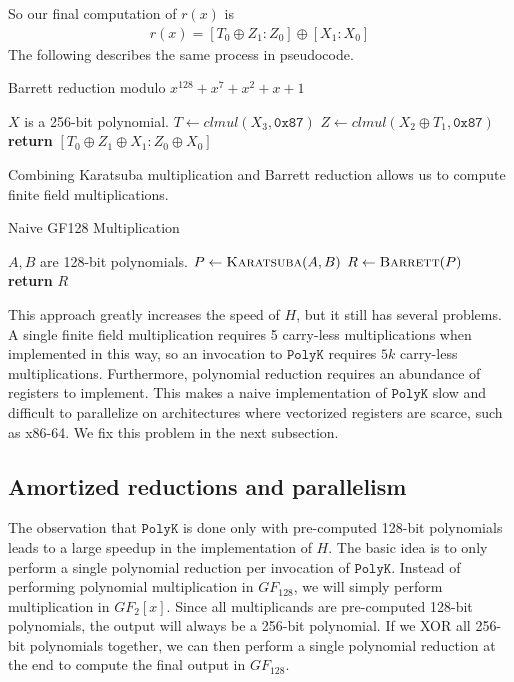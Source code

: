 \documentclass[hctr.tex]{subfiles}
\begin{document}
So our final computation of $r(x)$ is
\begin{align*}
       r(x) = [T_0 \oplus Z_1 : Z_0] \oplus [X_1 : X_0]
\end{align*}
The following describes the same process in pseudocode.
\begin{algorithm}[H]
	\caption{Barrett reduction modulo $x^{128} + x^7 + x^2 + x + 1$}\label{barrett}
\begin{algorithmic}[1]
	\Require $X$ is a 256-bit polynomial.
	 
		\State $T \gets clmul(X_3, \texttt{0x87})$
		\State $Z \gets clmul(X_2 \oplus T_1, \texttt{0x87})$ 
		\State \textbf{return} $[T_0 \oplus Z_1 \oplus X_1 : Z_0 \oplus X_0]$
	\EndProcedure
\end{algorithmic}
\end{algorithm}
Combining Karatsuba multiplication and Barrett reduction allows us to compute finite field multiplications.
\begin{algorithm}[H]
	\caption{Naive GF128 Multiplication}\label{GF128Naive}
\begin{algorithmic}[1]
	\Require $A, B$ are 128-bit polynomials.
		\State $P \gets \Call{Karatsuba}{A, B}$
		\State $R \gets \Call{Barrett}{P}$
		\State \textbf{return} $R$
	\EndProcedure
\end{algorithmic}
\end{algorithm}
This approach greatly increases the speed of $H$, but it still has several problems. A single finite field multiplication requires 5 carry-less multiplications when implemented in this way, so an invocation to $\texttt{PolyK}$ requires $5k$ carry-less multiplications. Furthermore, polynomial reduction requires an abundance of registers to implement. This makes a naive implementation of $\texttt{PolyK}$ slow and difficult to parallelize on architectures where vectorized registers are scarce, such as x86-64. We fix this problem in the next subsection.

\subsection{Amortized reductions and parallelism}
The observation that $\texttt{PolyK}$ is done only with pre-computed 128-bit polynomials leads to a large speedup in the implementation of $H$. The basic idea is to only perform a single polynomial reduction per invocation of $\texttt{PolyK}$. Instead of performing polynomial multiplication in $GF_{128}$, we will simply perform multiplication in $GF_{2}[x]$. Since all multiplicands are pre-computed 128-bit polynomials, the output will always be a 256-bit polynomial. If we XOR all 256-bit polynomials together, we can then perform a single polynomial reduction at the end to compute the final output in $GF_{128}$.
\end{document}
